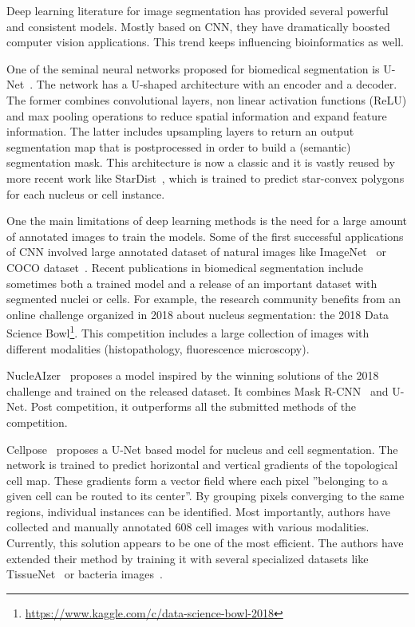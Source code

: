 Deep learning literature for image segmentation has provided several powerful and consistent models.
Mostly based on \ac{CNN}, they have dramatically boosted computer vision applications.
This trend keeps influencing bioinformatics as well.

One of the seminal neural networks proposed for biomedical segmentation is U-Net~\cite{Ronneberger_unet}.
The network has a U-shaped architecture with an encoder and a decoder.
The former combines convolutional layers, non linear activation functions (ReLU) and max pooling operations to reduce spatial information and expand feature information.
The latter includes upsampling layers to return an output segmentation map that is postprocessed in order to build a (semantic) segmentation mask.
This architecture is now a classic and it is vastly reused by more recent work like StarDist~\cite{schmidt2018}, which is trained to predict star-convex polygons for each nucleus or cell instance.

One the main limitations of deep learning methods is the need for a large amount of annotated images to train the models.
Some of the first successful applications of \ac{CNN} involved large annotated dataset of natural images like ImageNet~\cite{Deng_2009} or COCO dataset~\cite{Lin_2014}.
Recent publications in biomedical segmentation include sometimes both a trained model and a release of an important dataset with segmented nuclei or cells.
For example, the research community benefits from an online challenge organized in 2018 about nucleus segmentation: the 2018 Data Science Bowl\footnote{\url{https://www.kaggle.com/c/data-science-bowl-2018}}.
This competition includes a large collection of images with different modalities (histopathology, fluorescence microscopy).

NucleAIzer~\cite{hollandi_nucleaizer_2020} proposes a model inspired by the winning solutions of the 2018 challenge and trained on the released dataset.
It combines Mask R-CNN~\cite{He_2017_ICCV} and U-Net.
Post competition, it outperforms all the submitted methods of the competition.

Cellpose~\cite{stringer_cellpose_2021} proposes a U-Net based model for nucleus and cell segmentation.
The network is trained to predict horizontal and vertical gradients of the topological cell map.
These gradients form a vector field where each pixel ''belonging to a given cell can be routed to its center''.
By grouping pixels converging to the same regions, individual instances can be identified.
Most importantly, authors have collected and manually annotated 608 cell images with various modalities.
Currently, this solution appears to be one of the most efficient.
The authors have extended their method by training it with several specialized datasets like TissueNet~\cite{Greenwald_2022} or bacteria images~\cite{cutler_omnipose_2022}.

